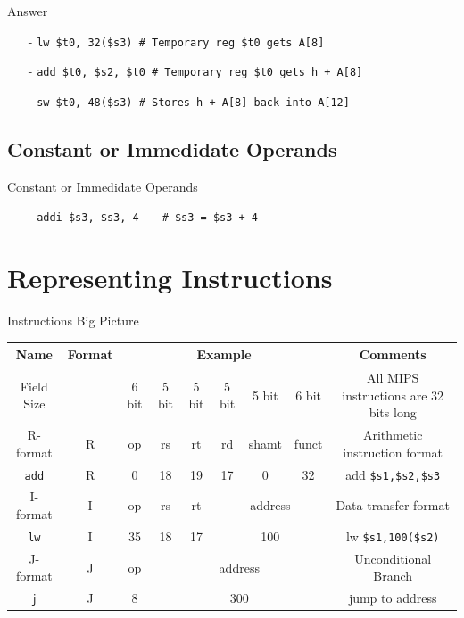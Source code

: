 \begin{frame}{Answer}
\begin{itemize}
\item[-]
\texttt{lw \$t0, 32(\$s3) \# Temporary reg \$t0 gets A[8]}

\item[-]
\texttt{add \$t0, \$s2, \$t0  \# Temporary reg \$t0 gets h + A[8]}

\item[-]
\texttt{sw \$t0, 48(\$s3)  \# Stores h + A[8] back into A[12]}
\end{itemize}    
\end{frame}

\subsection{Constant or Immedidate Operands}
\begin{frame}{Constant or Immedidate Operands}
\begin{itemize}
\item[-] \texttt{addi \$s3, \$s3, 4  $\, \, \, \, \,$ \# \$s3 = \$s3 + 4}
\end{itemize}
\end{frame}

\section{Representing Instructions}
\begin{frame}{Instructions Big Picture}
\begin{table}[H]
\begin{adjustbox}{width=\textwidth}
\begin{tabular}{|c|c|c|c|c|c|c|c|c|}
\hline
Name & Format & \multicolumn{6}{|c|}{Example} & Comments \\
\hline
\hline
Field Size && 6 bit & 5 bit & 5 bit & 5 bit & 5 bit & 6 bit & All MIPS instructions are 32 bits long \\
\hline
R-format & R & op & rs & rt & rd & shamt & funct & Arithmetic instruction format \\
\hline
\texttt{add} & R & 0 & 18 & 19 & 17 & 0 & 32 & add \texttt{\$s1,\$s2,\$s3} \\
\hline
I-format & I & op & rs & rt & \multicolumn{3}{|c|}{address} & Data transfer format\\
\hline
\texttt{lw} & I & 35 & 18 & 17 & \multicolumn{3}{|c|}{100} & lw \texttt{\$s1,100(\$s2)} \\
\hline
J-format & J & op & \multicolumn{5}{|c|}{address} & Unconditional Branch \\
\hline
\texttt{j} & J & 8 & \multicolumn{5}{|c|}{300} & jump to address \\
\hline
\end{tabular}
\end{adjustbox}
\end{table}
\end{frame}

